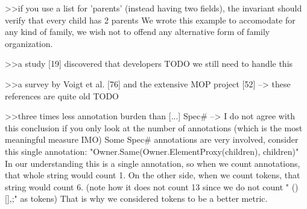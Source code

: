 >>if you use a list for 'parents' (instead having two fields), the invariant should verify that every child has 2 parents
We wrote this example to accomodate for any kind of family, we wish not to offend any alternative form of family organization.


>>a study [19] discovered that developers TODO we still need to handle this

>>a survey by Voigt et al. [76] and the extensive MOP project [52] --> these references are quite old TODO

>>three times less annotation burden than [...] Spec# --> I do not agree with this conclusion if you only look at the number of annotations (which is the most meaningful measure IMO)
Some Spec# annotations are very involved, consider this single annotation:
"Owner.Same(Owner.ElementProxy(children), children)" In our understanding this is a single annotation, so when we count annotations, that whole string would count 1.
On the other side, when we count tokens, that string would count 6.
(note how it does not count 13 since we do not count " ()[]{},;" as tokens)
That is why we considered tokens to be a better metric.

